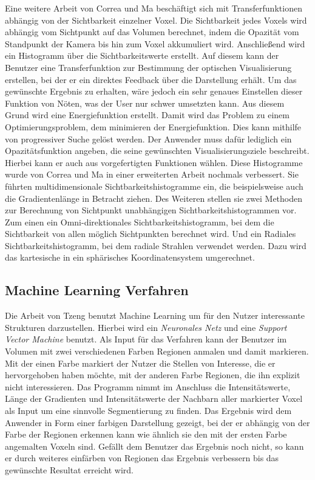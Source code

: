 Eine weitere Arbeit \cite{correa2009visibility} von Correa und Ma beschäftigt sich mit Transferfunktionen abhängig von der Sichtbarkeit einzelner Voxel.
Die Sichtbarkeit jedes Voxels wird abhängig vom Sichtpunkt auf das Volumen berechnet, indem die Opazität vom Standpunkt der Kamera bis hin zum Voxel akkumuliert wird. Anschließend wird ein Histogramm über die Sichtbarkeitswerte erstellt.
Auf diesem kann der Benutzer eine Transferfunktion zur Bestimmung der optischen Visualisierung erstellen, bei der er ein direktes Feedback über die Darstellung erhält.
Um das gewünschte Ergebnis zu erhalten, wäre jedoch ein sehr genaues Einstellen dieser Funktion von Nöten, was der User nur schwer umsetzten kann.
Aus diesem Grund wird eine Energiefunktion erstellt. Damit wird das Problem zu einem Optimierungsproblem, dem minimieren der Energiefunktion. Dies kann mithilfe von progressiver Suche gelöst werden. 
Der Anwender muss dafür lediglich ein Opazitätsfunktion angeben, die seine gewünschten Visualisierungsziele beschreibt. Hierbei kann er auch aus vorgefertigten Funktionen wählen.
Diese Histogramme wurde von Correa und Ma in einer erweiterten Arbeit \cite{correa2011visibility} nochmals verbessert. Sie führten multidimensionale Sichtbarkeitshistogramme ein, die beispielsweise auch die Gradientenlänge in Betracht ziehen.
Des Weiteren stellen sie zwei Methoden zur Berechnung von Sichtpunkt unabhängigen Sichtbarkeitshistogrammen vor. Zum einen ein Omni-direktionales Sichtbarkeitshistogramm, bei dem die Sichtbarkeit von allen möglich Sichtpunkten berechnet wird. Und ein Radiales Sichtbarkeitshistogramm, bei dem radiale Strahlen verwendet werden. Dazu wird das kartesische in ein sphärisches Koordinatensystem umgerechnet.



\subsection{Machine Learning Verfahren}

Die Arbeit von Tzeng \cite{tzeng2005intelligent} benutzt Machine Learning um für den Nutzer interessante Strukturen darzustellen. Hierbei wird ein \textit{Neuronales Netz} und eine \textit{Support Vector Machine} benutzt.
Als Input für das Verfahren kann der Benutzer im Volumen mit zwei verschiedenen Farben Regionen anmalen und damit markieren. Mit der einen Farbe markiert der Nutzer die Stellen von Interesse, die er hervorgehoben haben möchte, mit der anderen Farbe Regionen, die ihn explizit nicht interessieren.
\newline
Das Programm nimmt im Anschluss die Intensitätswerte, Länge der Gradienten und Intensitätswerte der Nachbarn aller markierter Voxel als Input um eine sinnvolle Segmentierung zu finden.
Das Ergebnis wird dem Anwender in Form einer farbigen Darstellung gezeigt, bei der er abhängig von der Farbe der Regionen erkennen kann wie ähnlich sie den mit der ersten Farbe angemalten Voxeln sind. Gefällt dem Benutzer das Ergebnis noch nicht, so kann er durch weiteres einfärben von Regionen das Ergebnis verbessern bis das gewünschte Resultat erreicht wird.


